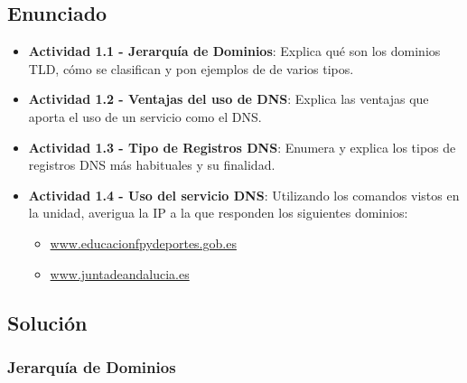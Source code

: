 \subsection{Enunciado}
\begin{itemize}
    \item \textbf{Actividad 1.1 - Jerarquía de Dominios}: Explica qué son los dominios TLD, cómo se clasifican y pon ejemplos de de varios tipos.
    \item \textbf{Actividad 1.2 - Ventajas del uso de DNS}: Explica las ventajas que aporta el uso de un servicio como el DNS.
    \item \textbf{Actividad 1.3 - Tipo de Registros DNS}: Enumera y explica los tipos de registros DNS más habituales y su finalidad.
    \item \textbf{Actividad 1.4 - Uso del servicio DNS}: Utilizando los comandos vistos en la unidad, averigua la IP a la que responden los siguientes dominios:
    \begin{itemize}
        \item \url{www.educacionfpydeportes.gob.es}
        \item  \url{www.juntadeandalucia.es}
   \end{itemize}
\end{itemize}

\subsection{Solución}

\subsubsection{Jerarquía de Dominios}

